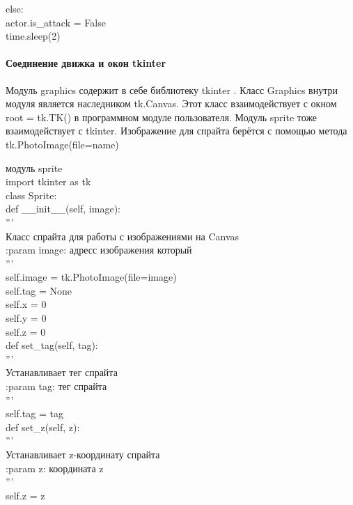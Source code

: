 else:\\
actor.is\_attack = False\\
time.sleep(2)\\

\paragraph{Соединение движка и окон tkinter}
Модуль graphics содержит в себе библиотеку tkinter . Класс Graphics внутри модуля является наследником tk.Canvas. Этот класс взаимодействует с окном root = tk.TK() в программном модуле пользователя. Модуль sprite тоже взаимодействует с tkinter. Изображение для спрайта берётся с помощью метода tk.PhotoImage(file=name)

модуль sprite\\

import tkinter as tk\\
class Sprite:\\

def \_\_init\_\_(self, image):\\
'''\\
Класс спрайта для работы с изображениями на Canvas\\

:param image: адресс изображения который\\
'''\\
self.image = tk.PhotoImage(file=image)\\
self.tag = None\\
self.x = 0\\
self.y = 0\\
self.z = 0\\

def set\_tag(self, tag):\\
'''\\
Устанавливает тег спрайта\\

:param tag: тег спрайта\\
'''\\
self.tag = tag\\

def set\_z(self, z):\\
'''\\
Устанавливает z-координату спрайта\\

:param z: координата z\\
'''\\
self.z = z\\

